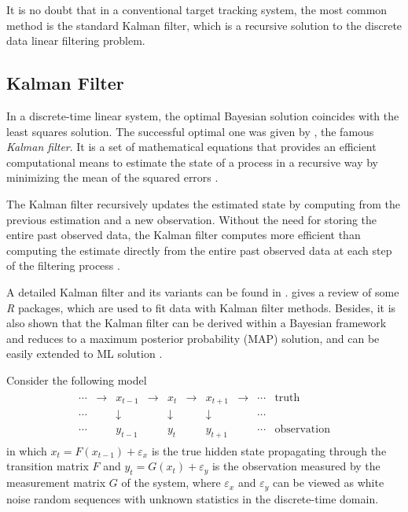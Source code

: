 It is no doubt that in a conventional target tracking system, the most common method is the standard Kalman filter, which is a recursive solution to the discrete data linear filtering problem. 



\subsection*{Kalman Filter}

In a discrete-time linear system, the optimal Bayesian solution coincides with the least squares solution. The successful optimal one was given by \cite{kalman1960new}, the famous \textit{Kalman filter}. It is a set of mathematical equations that provides an efficient computational means to estimate the state of a process in a recursive way by minimizing the mean of the squared errors \citep{bishop2001introduction}. 

The Kalman filter recursively updates the estimated state by computing from the previous estimation and a new observation. Without the need for storing the entire past observed data, the Kalman filter computes more efficient than computing the estimate directly from the entire past observed data at each step of the filtering process \citep{haykin2001kalman}.  

A detailed Kalman filter and its variants can be found in \citep{chen2003bayesian, rhodes1971tutorial, kailath1981lectures, sorenson1985kalman}. \cite{tusell2011kalman} gives a review of some \textit{R} packages, which are used to fit data with Kalman filter methods. Besides, it is also shown that the Kalman filter can be derived within a Bayesian framework and reduces to a maximum posterior probability (MAP) solution, and can be easily extended to ML solution \citep{haykin2001kalman, guzzi2016data}. 

Consider the following model 
\begin{align}\label{introKFmodel}
\begin{array}{cccccccccc}
\cdots &\to &x_{t-1}&\to &x_{t}&\to &x_{t+1}&\to &\cdots &{\text{truth}}\\
\cdots &&\downarrow &&\downarrow &&\downarrow && \cdots &\\ \cdots&&y_{t-1}&&y_{t}&&y_{t+1}&&\cdots &{\text{observation}}\end{array}
 \end{align}
in which $x_t=F(x_{t-1})+\varepsilon_x$ is the true hidden state propagating through the transition matrix $F$ and $y_t=G(x_t)+\varepsilon_y$ is the observation measured by the measurement matrix $G$ of the system, where $\varepsilon_x$ and $\varepsilon_y$ can be viewed as white noise random sequences with unknown statistics in the discrete-time domain. 

